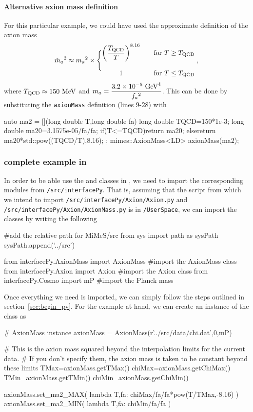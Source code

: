 \documentclass[11pt,a4paper]{article}
\begin{document}
\paragraph{Alternative axion mass definition}
%
For this particular example, we could have used the approximate definition of the axion mass
%
\begin{equation}
	\tilde m_{a}{}^2 \approx m_{a}{}^2 \times \Bigg\{ 
	\begin{matrix}
	\left( \dfrac{T_{\rm QCD}}{T} \right)^{8.16} & \quad \text{for } T\geq T_{\rm QCD} 
	\\ \\
	1 & \quad \text{for } T\leq T_{\rm QCD}
\end{matrix} \;,
	\label{eq:axM_approx}
\end{equation}
%
where $T_{\rm QCD}  \approx 150~{\rm MeV}$ and $m_{a}{}=\dfrac{3.2 \times 10^{-5} ~{\rm GeV}^4}{f_{a}{}^2}$. This can be done by substituting the {\tt axionMass} definition (lines $9$-$28$) with 
%
\begin{cpp}
	auto ma2 = [](long double T,long double fa){
	    long double TQCD=150*1e-3;
	    long double ma20=3.1575e-05/fa/fa;
	    if(T<=TQCD){return ma20;}
	    else{return ma20*std::pow((TQCD/T),8.16);}
	};
	mimes::AxionMass<LD> axionMass(ma2);
\end{cpp}


\subsubsection{complete example in \PY}
%
In order to be able use the  and  classes in \PY, we need to import the corresponding modules from {\tt \mimes/src/interfacePy}. That is, assuming that the script from which we intend to import {\tt \mimes/src/interfacePy/Axion/Axion.py} and {\tt \mimes/src/interfacePy/Axion/AxionMass.py} is in {\tt \mimes/UserSpace}, we can import the classes by writing the following
%
\begin{py}
	#add the relative path for MiMeS/src
	from sys import path as sysPath
	sysPath.append('../src')
	
	from interfacePy.AxionMass import AxionMass #import the AxionMass class
	from interfacePy.Axion import Axion #import the Axion class
	from interfacePy.Cosmo import mP #import the Planck mass
\end{py} 
%
Once everything we need is imported, we can simply follow the steps outlined in section~\ref{sec:begin_py}. For the example at hand, we can create an instance of the  class as
%
\begin{py}
	# AxionMass instance
	axionMass = AxionMass(r'../src/data/chi.dat',0,mP)
	
	# This is the axion mass squared beyond the interpolation limits for the current data. 
	# If you don't specify them, the axion mass is taken to be constant beyond these limits
	TMax=axionMass.getTMax() 
	chiMax=axionMass.getChiMax()
	TMin=axionMass.getTMin() 
	chiMin=axionMass.getChiMin()
	
	axionMass.set_ma2_MAX( lambda T,fa: chiMax/fa/fa*pow(T/TMax,-8.16) )
	axionMass.set_ma2_MIN( lambda T,fa: chiMin/fa/fa )
\end{py}
%
\end{document}
